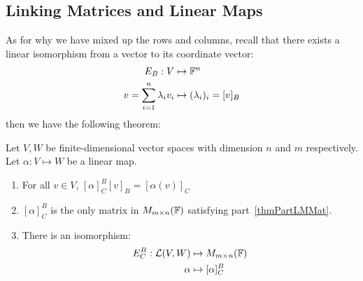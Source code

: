 \documentclass[../Main.tex]{subfiles}
\begin{document}
\subsection{Linking Matrices and Linear Maps}
As for why we have mixed up the rows and columns, recall that there exists a linear isomorphism from a vector to its coordinate vector:
\begin{align*}
    E_B : V &\mapsto \mathbb{F}^n\\
    v = \sum_{i=1}^{n}\lambda_i v_i &\mapsto (\lambda_i)_i = [v]_B
\end{align*}
then we have the following theorem:
\begin{theorem}
    Let $V, W$ be finite-dimensional vector spaces with dimension $n$ and $m$ respectively. Let $\alpha : V \mapsto W$ be a linear map.
    \begin{enumerate}
        \item For all $v \in V$, $[\alpha]_C^B [v]_B = [\alpha(v)]_C$ \label{thmPartLMMat}
        \item $[\alpha]_C^B$ is the only matrix in $M_{m \times n}(\mathbb{F})$ satisfying part~\ref{thmPartLMMat}. \label{thmPartLMMatUnique}
        \item There is an isomorphism:
            \begin{align*}
                E_C^B : \mathcal{L}(V, W) &\mapsto M_{m \times n}(\mathbb{F})\\
                \alpha &\mapsto [\alpha]_C^B
            \end{align*}
            \label{thmPartLMIsom}
    \end{enumerate}
    \label{thmMatrixOfLinMap}
\end{theorem}
\end{document}
